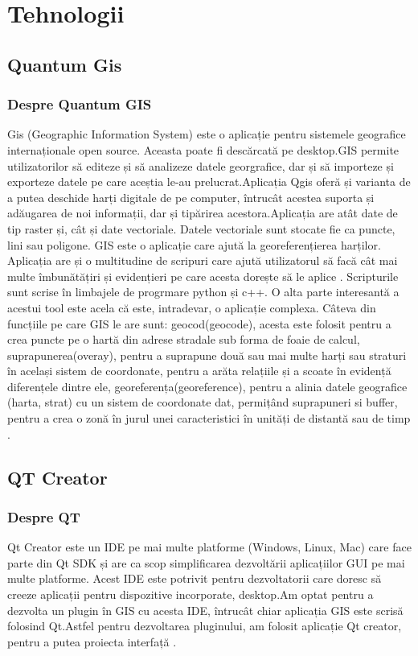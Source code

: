\documentclass[12pt,a4paper]{article}
\theoremstyle{definition}
\theoremstyle{remark}
\begin{document}
\section*{{\bf Tehnologii }}
\markright{}
\setcounter{section}{1}
\subsection{Quantum Gis}
\subsubsection{Despre Quantum GIS}
Gis (Geographic Information System) este o aplicație pentru sistemele geografice internaționale open source. Aceasta poate fi descărcată pe desktop.GIS permite utilizatorilor să editeze și să analizeze datele georgrafice, dar și să importeze și exporteze datele pe care aceștia le-au prelucrat.Aplicația Qgis oferă și varianta de a putea deschide harți digitale de pe computer, întrucât acestea suporta și adăugarea de noi informații, dar și tipărirea acestora.Aplicația are atât date de tip raster și, cât și date vectoriale. Datele vectoriale sunt stocate fie ca puncte, lini sau poligone. GIS este o aplicație care ajută la georeferențierea harților. Aplicația are și o multitudine de scripuri care ajută utilizatorul să facă cât mai multe îmbunătățiri și evidențieri pe care acesta dorește să le aplice \cite{qgis2}. Scripturile sunt scrise în limbajele de progrmare python și c++. O alta parte interesantă a acestui tool este acela că este, intradevar, o aplicație complexa. Câteva din funcțiile pe care GIS le are sunt: geocod(geocode), acesta este folosit pentru a crea puncte pe o hartă din adrese stradale sub forma de foaie de calcul, suprapunerea(overay), pentru a suprapune două sau mai multe harți sau straturi în același sistem de coordonate, pentru a arăta relațiile și a scoate în evidență diferențele  dintre ele, georeferența(georeference), pentru a alinia datele geografice (harta, strat) cu un sistem de coordonate dat, permițând suprapuneri si  buffer, pentru a crea o zonă în jurul unei caracteristici în unități de distantă sau de timp \cite{qgis}.
\subsection{QT Creator}
\subsubsection{Despre QT}
Qt Creator este un IDE pe mai multe platforme (Windows, Linux, Mac) care face parte din Qt SDK și are ca scop simplificarea dezvoltării aplicațiilor GUI pe mai multe platforme. Acest IDE este potrivit pentru dezvoltatorii care doresc să creeze aplicații pentru dispozitive incorporate, desktop.Am optat pentru a dezvolta un plugin în GIS cu acesta IDE, întrucât chiar aplicația GIS este scrisă folosind Qt.Astfel pentru dezvoltarea pluginului, am folosit aplicație Qt creator, pentru a putea proiecta interfață \cite{qt}.
\end{document}
